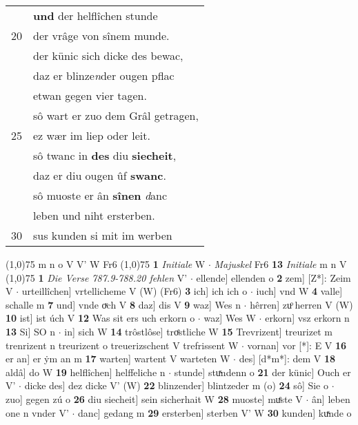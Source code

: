 \documentclass[8pt,a4paper,notitlepage]{article}
\begin{document}
\begin{table}[ht]
\begin{minipage}[t]{0.5\linewidth}
\begin{tabular}{rl}
 & \textbf{und} der helflîchen stunde\\ 
20 & der vrâge von sînem munde.\\ 
 & der künic sich dicke des bewac,\\ 
 & daz er blinze\textit{n}der ougen pflac\\ 
 & etwan gegen vier tagen.\\ 
 & sô wart er zuo dem Grâl getragen,\\ 
25 & ez wær im liep oder leit.\\ 
 & sô twanc in \textbf{des} diu \textbf{siecheit},\\ 
 & daz er diu ougen ûf \textbf{swanc}.\\ 
 & sô muoste er ân \textbf{sînen} \textit{d}anc\\ 
 & leben und niht ersterben.\\ 
30 & sus kunden si mit im werben\\ 
\end{tabular}
\scriptsize
\line(1,0){75} \newline
m n o V V' W Fr6 \newline
\line(1,0){75} \newline
\textbf{1} \textit{Initiale} W   $\cdot$ \textit{Majuskel} Fr6  \textbf{13} \textit{Initiale} m n V  \newline
\line(1,0){75} \newline
\textbf{1} \textit{Die Verse 787.9-788.20 fehlen} V'   $\cdot$ ellende] ellenden o \textbf{2} zem] [Z*]: Zeim V  $\cdot$ urteillîchen] vrtellicheme V (W) (Fr6) \textbf{3} ich] ich ich o  $\cdot$ iuch] vnd W \textbf{4} valle] schalle m \textbf{7} und] vnde oͮch V \textbf{8} daz] dis V \textbf{9} waz] Wes n  $\cdot$ hêrren] zuͦ herren V (W) \textbf{10} ist] ist úch V \textbf{12} Was sit ers uch erkorn o  $\cdot$ waz] Wes W  $\cdot$ erkorn] vsz erkorn n \textbf{13} Si] SO n  $\cdot$ in] sich W \textbf{14} trôstlôse] troͤstliche W \textbf{15} Trevrizent] treurizet m trenrizent n treurizent o treuerizschent V trefrissent W  $\cdot$ vornan] vor [*]: E V \textbf{16} er an] er ẏm an m \textbf{17} warten] wartent V warteten W  $\cdot$ des] [d*m*]: dem V \textbf{18} aldâ] do W \textbf{19} helflîchen] helffeliche n  $\cdot$ stunde] stuͯndenn o \textbf{21} der künic] Ouch er V'  $\cdot$ dicke des] dez dicke V' (W) \textbf{22} blinzender] blintzeder m (o) \textbf{24} sô] Sie o  $\cdot$ zuo] gegen zú o \textbf{26} diu siecheit] sein sicherhait W \textbf{28} muoste] muͤste V  $\cdot$ ân] leben one n vnder V'  $\cdot$ danc] gedang m \textbf{29} ersterben] sterben V' W \textbf{30} kunden] kuͯnde o \newline
\end{minipage}
\end{table}
\end{document}
